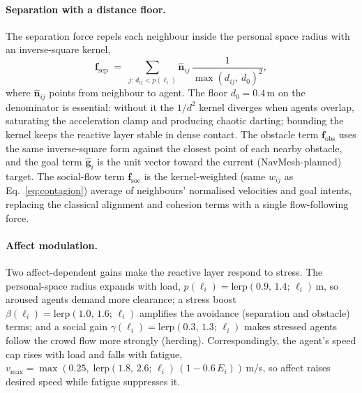 \documentclass[sigconf,nonacm]{acmart}
\begin{document}
\paragraph{Separation with a distance floor.} The separation force repels each neighbour inside the personal space radius with an inverse-square kernel,
\begin{equation}
\mathbf{f}_{\mathrm{sep}} \;=\; \sum_{j:\,d_{ij}<p(\ell_i)} \hat{\mathbf{n}}_{ij}\,\frac{1}{\max(d_{ij},\,d_0)^2},
\end{equation}
where $\hat{\mathbf{n}}_{ij}$ points from neighbour to agent. The floor $d_0=0.4$\,m on the denominator is essential: without it the $1/d^2$ kernel diverges when agents overlap, saturating the acceleration clamp and producing chaotic darting; bounding the kernel keeps the reactive layer stable in dense contact. The obstacle term $\mathbf{f}_{\mathrm{obs}}$ uses the same inverse-square form against the closest point of each nearby obstacle, and the goal term $\hat{\mathbf{g}}_i$ is the unit vector toward the current (NavMesh-planned) target. The social-flow term $\mathbf{f}_{\mathrm{soc}}$ is the kernel-weighted (same $w_{ij}$ as Eq.~\eqref{eq:contagion}) average of neighbours' normalised velocities and goal intents, replacing the classical alignment and cohesion terms with a single flow-following force.

\paragraph{Affect modulation.} Two affect-dependent gains make the reactive layer respond to stress. The personal-space radius expands with load, $p(\ell_i)=\mathrm{lerp}(0.9,\,1.4;\,\ell_i)$\,m, so aroused agents demand more clearance; a stress boost $\beta(\ell_i)=\mathrm{lerp}(1.0,\,1.6;\,\ell_i)$ amplifies the avoidance (separation and obstacle) terms; and a social gain $\gamma(\ell_i)=\mathrm{lerp}(0.3,\,1.3;\,\ell_i)$ makes stressed agents follow the crowd flow more strongly (herding). Correspondingly, the agent's speed cap rises with load and falls with fatigue, $v_{\max}=\max(0.25,\;\mathrm{lerp}(1.8,\,2.6;\,\ell_i)\,(1-0.6\,E_i))$\,m/s, so affect raises desired speed while fatigue suppresses it.
\end{document}
